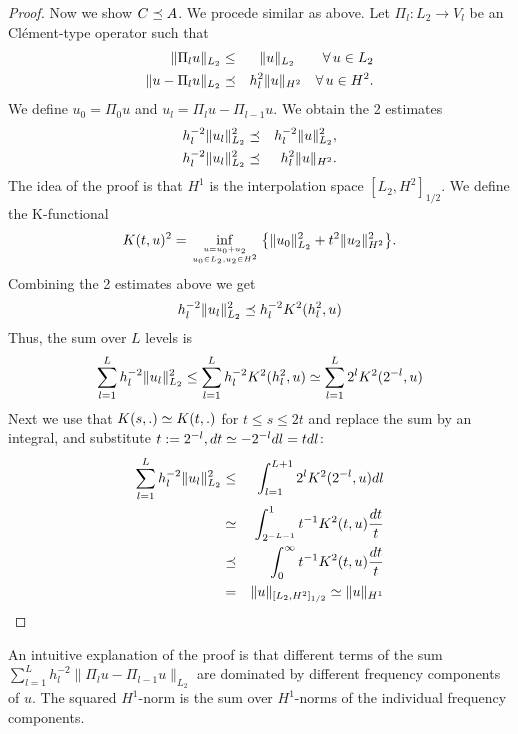 \begin{proof}
Now we show $C \preceq A$. We procede similar as above. 
Let $\Pi_l : L_2 \rightarrow V_l$ be an Cl\'ement-type operator 
such that
\begin{eqnarray*}
\| \Pi_l u \|_{L_2} & \leq & \| u \|_{L_2}  \qquad \forall \, u \in L_2 \\
\| u - \Pi_l u \|_{L_2} & \preceq & h_l^2 \| u \|_{H^2} \quad \forall \, u \in H^2.
\end{eqnarray*}
We define $u_0 = \Pi_0 u$ and $u_l = \Pi_l u - \Pi_{l-1} u$. We obtain
the 2 estimates
\begin{eqnarray*}
h_l^{-2} \| u_l \|_{L_2}^2 & \preceq & h_l^{-2} \| u \|_{L_2}^2, \\
h_l^{-2} \| u_l \|_{L_2}^2 & \preceq & h_l^2 \| u \|_{H^2}.
\end{eqnarray*}
The idea of the proof is that $H^1$ is the interpolation space $[L_2, H^2]_{1/2}$. We define the K-functional
$$
K(t,u)^2 = \inf_{u = u_0 + u_2 \atop u_0 \in L_2, u_2 \in H^2}
\big\{ \| u_0 \|_{L_2}^2 + t^2 \| u_2 \|_{H^2}^2 \big\}.
$$
Combining the 2 estimates above we get
$$
h_l^{-2} \| u_l \|_{L_2}^2 \preceq h_l^{-2} K^2 (h_l^2, u)
$$
Thus, the sum over $L$ levels is
$$
\sum_{l=1}^L h_l^{-2} \| u_l \|_{L_2}^2 \leq \sum_{l=1}^L h_l^{-2} K^2 (h_l^2, u) \simeq \sum_{l=1}^L 2^l K^2(2^{-l}, u)
$$
Next we use that $K(s,.) \simeq K(t,.)$ for $t \leq s \leq 2t$ and replace
the sum by an integral, and substitute $t := 2^{-l}, dt \simeq -2^{-l} dl = t dl$:
\begin{eqnarray*}
\sum_{l=1}^L h_l^{-2} \| u_l \|_{L_2}^2 & \leq & 
\int_{l=1}^{L+1} 2^l K^2(2^{-l}, u) dl \\
& \simeq & \int_{2^{-L-1}}^1 t^{-1} K^2(t,u) \frac{dt}{t}  \\
& \preceq & \int_0^\infty t^{-1} K^2(t,u) \frac{dt}{t} \\
& = & \| u \|_{[L_2,H^2]_{1/2}} \simeq \| u \|_{H^1}
\end{eqnarray*}
\end{proof}
An intuitive explanation of the proof is that different terms of 
the sum
$\sum_{l=1}^L h_l^{-2} \| \Pi_l u - \Pi_{l-1} u \|_{L_2}$ 
are dominated by different frequency 
components of $u$. The squared $H^1$-norm is the sum over $H^1$-norms of
the individual frequency components.

% 